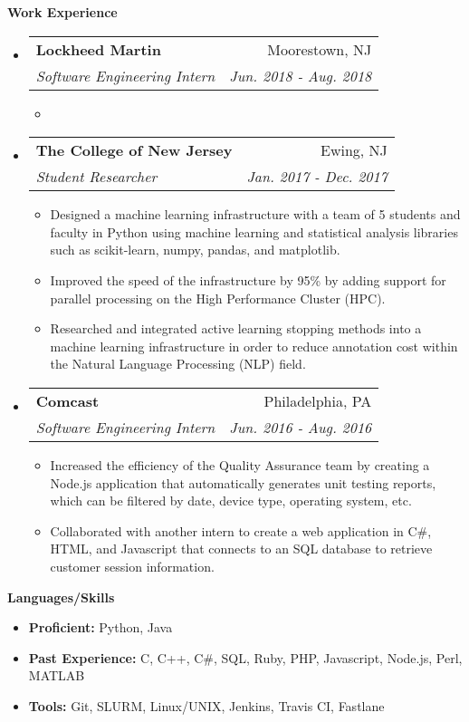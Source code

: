 \documentclass[letterpaper,10pt]{article}
\makeatletter
\newcommand{\resitem}[1]{\item #1 \vspace{-2pt}}
\newcommand{\resheading}[1]{{\large \colorbox{mygrey}{\begin{minipage}{\textwidth}{\textbf{#1 \vphantom{p\^{E}}}}\end{minipage}}}}
\newcommand{\ressubheading}[4]{
\begin{tabular*}{7.0in}{l@{\extracolsep{\fill}}r}
		\textbf{#1} & #2 \\
		\textit{#3} & \textit{#4} \\
\end{tabular*}\vspace{-6pt}}
\makeatother
\begin{document}
\resheading{Work Experience}
\begin{itemize}

\item
	\ressubheading{Lockheed Martin}{Moorestown, NJ}{Software Engineering Intern}{Jun. 2018 - Aug. 2018}
	\begin{itemize}
		\resitem{}
		\end{itemize}	
\item
	\ressubheading{The College of New Jersey}{Ewing, NJ}{Student Researcher}{Jan. 2017 - Dec. 2017}
	\begin{itemize}
		\resitem{Designed a machine learning infrastructure with a team of 5 students and faculty in Python using machine learning and statistical analysis libraries such as scikit-learn, numpy, pandas, and matplotlib.}
		\resitem{Improved the speed of the infrastructure by 95\% by adding support for parallel processing on the High Performance Cluster (HPC).}
		\resitem{Researched and integrated active learning stopping methods into a machine learning infrastructure in order to reduce annotation cost within the Natural Language Processing (NLP) field.}
		\end{itemize}
		
\item
	\ressubheading{Comcast}{Philadelphia, PA}{Software Engineering Intern}{Jun. 2016 - Aug. 2016}
	\begin{itemize}
		\resitem{Increased the efficiency of the Quality Assurance team by creating a Node.js application that automatically generates unit testing reports, which can be filtered by date, device type, operating system, etc.}
		\resitem{Collaborated with another intern to create a web application in C\#, HTML, and Javascript that connects to an SQL database to retrieve customer session information.}
	\end{itemize}
\end{itemize}

\resheading{Languages/Skills}
	\begin{itemize}
	\resitem{\textbf{Proficient:} Python, Java}
	\resitem{\textbf{Past Experience:} C, C++, C\#, SQL, Ruby, PHP, Javascript, Node.js, Perl, MATLAB}
	\resitem{\textbf{Tools:} Git, SLURM, Linux/UNIX, Jenkins, Travis CI, Fastlane}
	\end{itemize}
\end{document}
